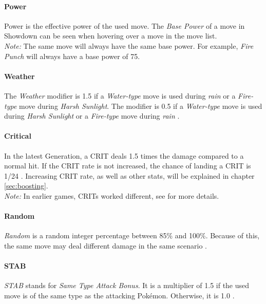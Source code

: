 \paragraph{Power}
Power is the effective power of the used move.
The \textit{Base Power} of a move in Showdown can be seen when hovering over a move in the move list. \\
\textit{Note:} The same move will always have the same base power. For example, \textit{Fire Punch} will
always have a base power of 75\cite{Bulbapedia:FirePunch}.

\paragraph{Weather}
The \textit{Weather} modifier is 1.5 if a \textit{Water-type} move is used during \textit{rain} or a 
\textit{Fire-type} move during \textit{Harsh Sunlight}. The modifier is 0.5 if a \textit{Water-type} move
is used during \textit{Harsh Sunlight} or a \textit{Fire-type} move during \textit{rain} \cite{Bulbapedia:Damage}.

\paragraph{Critical}
In the latest Generation, a \ac{CRIT} deals 1.5 times the damage compared to a normal hit.
If the \ac{CRIT} rate is not increased, the chance of landing a \ac{CRIT} is 1/24
\cite{Bulbapedia:CriticalHit}. Increasing \ac{CRIT} rate, as well as other stats, will 
be explained in chapter \ref{sec:boosting}. \\
\textit{Note:} In earlier games, \ac{CRIT}s worked different, see \cite{Bulbapedia:CriticalHit} for
more details.

\paragraph{Random}
\textit{Random} is a random integer percentage between 85\% and 100\%. Because of this, the same move
may deal different damage in the same scenario \cite{Bulbapedia:Damage}.

\paragraph{STAB}
\textit{STAB} stands for \textit{Same Type Attack Bonus}. It is a multiplier of 1.5 if the used move
is of the same type as the attacking Pokémon. Otherwise, it is 1.0 \cite{Bulbapedia:Damage}.

